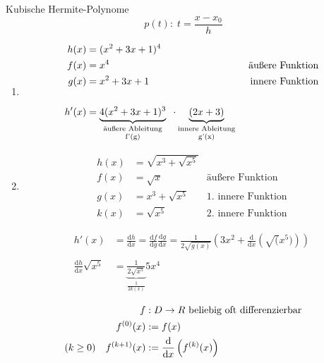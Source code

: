 \begin{example}
	Kubische Hermite-Polynome
	\begin{equation*}
		p(t):\; t = \frac{x-x_0}{h}
	\end{equation*}
	
	\begin{enumerate}
		\item
		\begin{align*}
			h(x) &= (x^2 + 3x + 1)^4\\
			f(x) &= x^4 &\text{äußere Funktion} \\
			g(x) &= x^2 + 3x + 1 &\text{innere Funktion} \\
			\\
			h'(x) &= \underbrace{4 (x^2 + 3x + 1)^3}_{\parbox{23mm}{\centering\scriptsize \text{äußere Ableitung} f'(g)}}\;\;\cdot\!\! \underbrace{(2x + 3)}_{\parbox{23mm}{\centering\scriptsize \text{innere Ableitung} g'(x)}}
		\end{align*}
		
		\item
		\begin{align*}
			h(x) &= \sqrt{x^3 + \sqrt{x^5}} \\
			f(x) &= \sqrt{x} & \text{äußere Funktion}\\
			g(x) &= x^3 + \sqrt{x^5} & \text{1. innere Funktion} \\
			k(x) &= \sqrt{x^5} & \text{2. innere Funktion}
		\end{align*}
		
		\begin{align*}
			h'(x) &= \frac{\mathrm dh}{\mathrm dx} = 
			\frac{\mathrm df}{\mathrm dg}\frac{\mathrm dg}{\mathrm dx} =
			\frac{1}{2\sqrt{g(x)}} \left( 3x^2 + \frac{\mathrm d}{\mathrm dx} \left( \sqrt(x^5) \right)\right) \\
			\\
			\frac{\mathrm dh}{\mathrm dx} \sqrt{x^5} &= \underbrace{\frac{1}{2\sqrt{x^5}}}_{\frac{1}{2k(x)}} 5x^4
		\end{align*}
	\end{enumerate}
\end{example}

\begin{definition}
	\begin{align*}
		f&: D \rightarrow R \text{ beliebig oft differenzierbar} \\
		f^{(0)}(x) &:= f(x) \\
		(k \geq 0) \hspace{10px} f^{(k+1)}(x) &:= \frac{\mathrm d}{\mathrm dx} \left( f^{(k)}(x) \right)
	\end{align*}
\end{definition}
	
